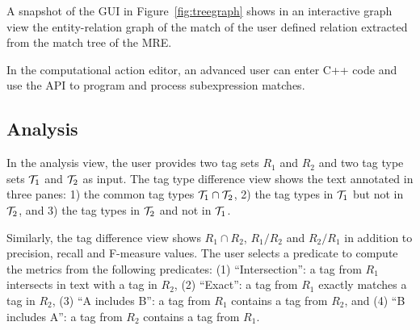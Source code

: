 A snapshot of the GUI in 
Figure~\ref{fig:treegraph} shows in an interactive graph view
the entity-relation graph of the match of the user defined relation 
extracted from the match tree of the MRE. 

In the computational action editor, an advanced user can 
enter C++ code and use the \framework API to program and process 
subexpression matches. 

\subsection{Analysis}

In the analysis view, the user provides 
two tag sets $R_1$ and $R_2$ and 
two tag type sets ${\cal T}_1$ and ${\cal T}_2$ as input. 
%
The tag type difference view shows the text annotated in three panes: 
1) the common tag types ${\cal T}_1 \cap {\cal T}_2$,
2) the tag types in ${\cal T}_1$ but not in ${\cal T}_2$, 
and 3) the tag types in ${\cal T}_2$ and not in ${\cal T}_1$.

Similarly, the tag difference view shows $R_1\cap R_2$, $R_1/R_2$ and $R_2/R_1$
in addition to precision, recall and F-measure values. 
The user selects a predicate to compute the metrics from the following predicates:
(1) ``Intersection'': a tag from $R_1$ intersects in text with a tag in $R_2$,
(2) ``Exact'': a tag from $R_1$ exactly matches a tag in $R_2$,
(3) ``A includes B'': a tag from $R_1$ contains a tag from $R_2$, and
(4) ``B includes A'': a tag from $R_2$ contains a tag from $R_1$.
